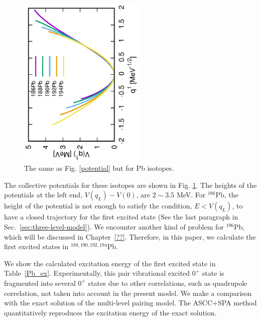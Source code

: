 \documentclass[11pt]{book} %
\begin{document}
\begin{figure}[bt]
 \begin{center}
  \includegraphics[width=60mm,angle=-90]{images/Pbpotential.eps}
 \end{center}
	\caption{The same as Fig. \ref{potential} but for Pb isotopes.
}
 \label{Pb_potential}
\end{figure}
The collective potentials for these isotopes are shown
in Fig. \ref{Pb_potential}.
The heights of the potentials at the left end, $V(q_L)-V(0)$,
are $2\sim3.5$ MeV.
For $^{186}$Pb, the height of the potential is not
enough to satisfy the condition, $E<V(q_L)$,
to have a closed trajectory for the first excited state
(See the last paragraph in Sec.~\ref{sec:three-level-model}).
We encounter another kind of problem for $^{196}$Pb,
which will be discussed in Chapter~\ref{??}.
Therefore, in this paper, we calculate the first excited states
in $^{188,190,192,194}$Pb.


We show the calculated excitation energy of the first excited state
in Table~\ref{Pb_ex}.
Experimentally, this pair vibrational excited $0^+$ state is
fragmented into several $0^+$ states due to other correlations,
such as quadrupole correlation, not taken into account in the present model.
We make a comparison with the exact solution of the multi-level
pairing model.
The ASCC+SPA method quantitatively reproduces the excitation energy of
the exact solution.
\end{document}
